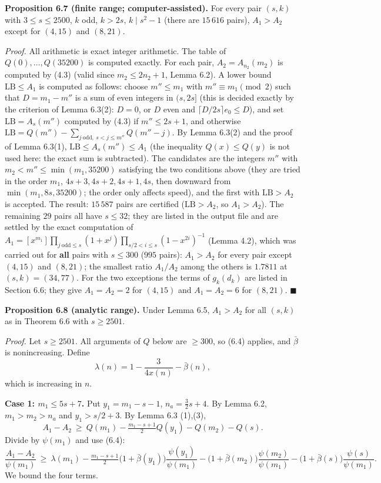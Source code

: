\textbf{Proposition 6.7 (finite range; computer-assisted).} For every pair \((s,k)\) with \(3\le s\le2500\), \(k\) odd, \(k>2s\), \(k\mid s^2-1\) (there are \(15\,616\) pairs), \(A_1>A_2\) except for \((4,15)\) and \((8,21)\).

\emph{Proof.} All arithmetic is exact integer arithmetic. The table of \(Q(0),\dots,Q(35200)\) is computed exactly. For each pair, \(A_2=A_{n_2}(m_2)\) is computed by (4.3) (valid since \(m_2\le2n_2+1\), Lemma 6.2). A lower bound \(\mathrm{LB}\le A_1\) is computed as follows: choose \(m''\le m_1\) with \(m''\equiv m_1\pmod2\) such that \(D=m_1-m''\) is a sum of even integers in \((s,2s]\) (this is decided exactly by the criterion of Lemma 6.3(2): \(D=0\), or \(D\) even and \(\lceil D/2s\rceil e_0\le D\)), and set \(\mathrm{LB}=A_s(m'')\) computed by (4.3) if \(m''\le2s+1\), and otherwise \(\mathrm{LB}=Q(m'')-\sum_{j\ \mathrm{odd},\ s<j\le m''}Q(m''-j)\). By Lemma 6.3(2) and the proof of Lemma 6.3(1), \(\mathrm{LB}\le A_s(m'')\le A_1\) (the inequality \(Q(x)\le Q(y)\) is not used here: the exact sum is subtracted). The candidates are the integers \(m''\) with \(m_2<m''\le\min(m_1,35200)\) satisfying the two conditions above (they are tried in the order \(m_1\), \(4s+3,4s+2,4s+1,4s\), then downward from \(\min(m_1,8s,35200)\); the order only affects speed), and the first with \(\mathrm{LB}>A_2\) is accepted. The result: \(15\,587\) pairs are certified (\(\mathrm{LB}>A_2\), so \(A_1>A_2\)). The remaining \(29\) pairs all have \(s\le32\); they are listed in the output file and are settled by the exact computation of \(A_1=[x^{m_1}]\prod_{j\ \mathrm{odd}\le s}(1+x^j)\prod_{s/2<i\le s}(1-x^{2i})^{-1}\) (Lemma 4.2), which was carried out for \textbf{all} pairs with \(s\le300\) (\(995\) pairs): \(A_1>A_2\) for every pair except \((4,15)\) and \((8,21)\); the smallest ratio \(A_1/A_2\) among the others is \(1.7811\) at \((s,k)=(34,77)\). For the two exceptions the terms of \(g_k(d_k)\) are listed in Section 6.6; they give \(A_1=A_2=2\) for \((4,15)\) and \(A_1=A_2=6\) for \((8,21)\). \(\blacksquare\)

\textbf{Proposition 6.8 (analytic range).} Under Lemma 6.5, \(A_1>A_2\) for all \((s,k)\) as in Theorem 6.6 with \(s\ge2501\).

\emph{Proof.} Let \(s\ge2501\). All arguments of \(Q\) below are \(\ge300\), so (6.4) applies, and \(\bar\beta\) is nonincreasing. Define
\[\lambda(n)=1-\frac3{4x(n)}-\bar\beta(n),\]
which is increasing in \(n\).

\textbf{Case 1: \(m_1\le5s+7\).} Put \(y_1=m_1-s-1\), \(n_a=\frac32s+4\). By Lemma 6.2, \(m_1>m_2>n_a\) and \(y_1>s/2+3\). By Lemma 6.3 (1),(3),
\[A_1-A_2\ \ge\ Q(m_1)-\tfrac{m_1-s+1}{2}Q(y_1)-Q(m_2)-Q(s).\]
Divide by \(\psi(m_1)\) and use (6.4):
\[\frac{A_1-A_2}{\psi(m_1)}\ \ge\ \lambda(m_1)-\tfrac{m_1-s+1}2\bigl(1+\bar\beta(y_1)\bigr)\frac{\psi(y_1)}{\psi(m_1)}-\bigl(1+\bar\beta(m_2)\bigr)\frac{\psi(m_2)}{\psi(m_1)}-\bigl(1+\bar\beta(s)\bigr)\frac{\psi(s)}{\psi(m_1)}.\]
We bound the four terms.

